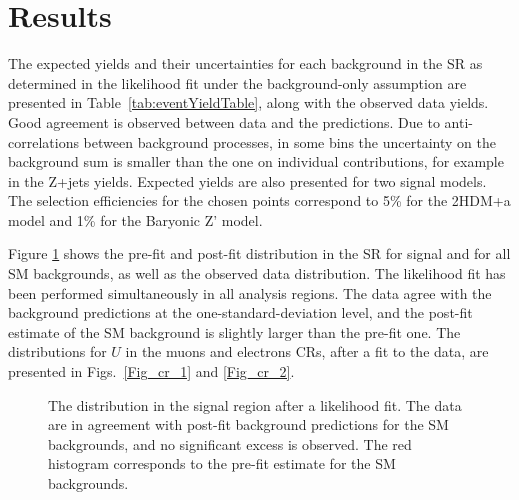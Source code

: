 \section{Results}

The expected yields and their uncertainties for each background in the SR as determined in the likelihood fit under the background-only assumption are presented in Table~\ref{tab:eventYieldTable}, along with the observed data yields.
Good agreement is observed between data and the predictions. Due to anti-correlations between background processes, in some bins the uncertainty on the background sum is smaller than the one on individual contributions, for example in the Z+jets yields. Expected yields are also presented for two signal models. The selection efficiencies for the chosen points correspond to 5\% for the 2HDM+a model and 1\% for the Baryonic Z' model. %


Figure \ref{Fig_sr} shows the pre-fit and post-fit \MET distribution in the SR for signal and for all SM backgrounds, as well as the observed data distribution. The likelihood fit has been performed simultaneously in all analysis regions. The data agree with the background predictions at the one-standard-deviation level, and the post-fit estimate of the SM background is slightly larger than the pre-fit one. The distributions for $U$ in the muons and electrons CRs, after a fit to the data, are presented in Figs.~\ref{Fig_cr_1} and \ref{Fig_cr_2}.

\begin{figure}
\centering
\caption{The \MET distribution in the signal region after a likelihood fit. The data are in agreement with post-fit background predictions for the SM backgrounds, and no significant excess is observed. The red histogram corresponds to the pre-fit estimate for the SM backgrounds.}
\label{Fig_sr}
\end{figure}

